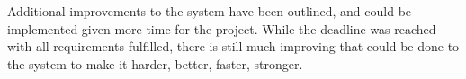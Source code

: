 \begin{Overview}
Additional improvements to the system have been outlined, and could be implemented given more time for the project. While the deadline was reached with all requirements fulfilled, there is still much improving that could be done to the system to make it harder, better, faster, stronger.


\end{Overview}
